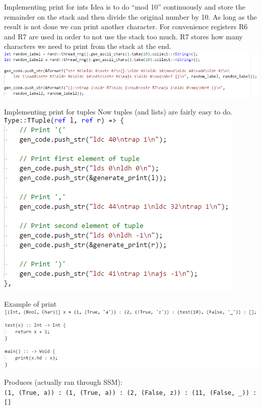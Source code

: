 \documentclass[10pt]{beamer}
\begin{document}
\begin{frame}{Implementing print for ints}
Idea is to do ``mod 10'' continuously and store the remainder on the stack and then divide the original number by 10. As long as the result is not done we can print another character. For convenience registers R6 and R7 are used in order to not use the stack too much. R7 stores how many characters we need to print from the stack at the end.
\includegraphics[width=\textwidth]{presentation3/7.png}
\end{frame}

\begin{frame}{Implementing print for tuples}
Now tuples (and lists) are fairly easy to do.
\includegraphics[width=\textwidth]{presentation3/8.png}
\end{frame}

\begin{frame}{Example of print}
\includegraphics[width=\textwidth]{presentation3/9.png}

Produces (actually ran through SSM):\\
\texttt{(1, (True, a)) : (1, (True, a)) : (2, (False, z)) : (11, (False, \_)) : []}
\end{frame}
\end{document}
